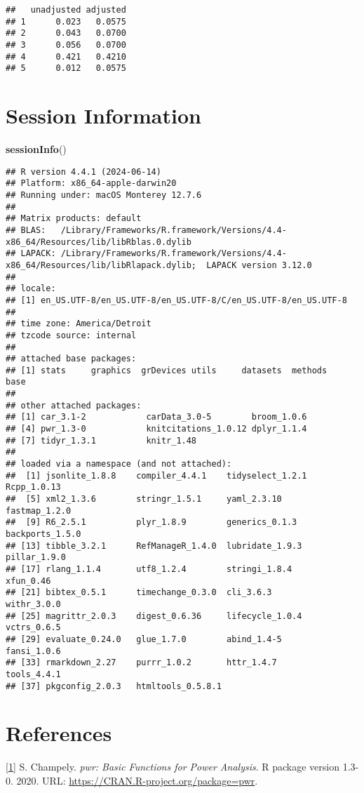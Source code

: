 \documentclass[
]{article}
\newenvironment{Shaded}{\begin{snugshade}}{\end{snugshade}}
\newcommand{\FunctionTok}[1]{\textcolor[rgb]{0.13,0.29,0.53}{\textbf{#1}}}
\newcommand{\NormalTok}[1]{#1}
\begin{document}
\begin{verbatim}
##   unadjusted adjusted
## 1      0.023   0.0575
## 2      0.043   0.0700
## 3      0.056   0.0700
## 4      0.421   0.4210
## 5      0.012   0.0575
\end{verbatim}

\section{Session Information}\label{session-information}

\begin{Shaded}
\begin{Highlighting}[]
\FunctionTok{sessionInfo}\NormalTok{()}
\end{Highlighting}
\end{Shaded}

\begin{verbatim}
## R version 4.4.1 (2024-06-14)
## Platform: x86_64-apple-darwin20
## Running under: macOS Monterey 12.7.6
## 
## Matrix products: default
## BLAS:   /Library/Frameworks/R.framework/Versions/4.4-x86_64/Resources/lib/libRblas.0.dylib 
## LAPACK: /Library/Frameworks/R.framework/Versions/4.4-x86_64/Resources/lib/libRlapack.dylib;  LAPACK version 3.12.0
## 
## locale:
## [1] en_US.UTF-8/en_US.UTF-8/en_US.UTF-8/C/en_US.UTF-8/en_US.UTF-8
## 
## time zone: America/Detroit
## tzcode source: internal
## 
## attached base packages:
## [1] stats     graphics  grDevices utils     datasets  methods   base     
## 
## other attached packages:
## [1] car_3.1-2            carData_3.0-5        broom_1.0.6         
## [4] pwr_1.3-0            knitcitations_1.0.12 dplyr_1.1.4         
## [7] tidyr_1.3.1          knitr_1.48          
## 
## loaded via a namespace (and not attached):
##  [1] jsonlite_1.8.8    compiler_4.4.1    tidyselect_1.2.1  Rcpp_1.0.13      
##  [5] xml2_1.3.6        stringr_1.5.1     yaml_2.3.10       fastmap_1.2.0    
##  [9] R6_2.5.1          plyr_1.8.9        generics_0.1.3    backports_1.5.0  
## [13] tibble_3.2.1      RefManageR_1.4.0  lubridate_1.9.3   pillar_1.9.0     
## [17] rlang_1.1.4       utf8_1.2.4        stringi_1.8.4     xfun_0.46        
## [21] bibtex_0.5.1      timechange_0.3.0  cli_3.6.3         withr_3.0.0      
## [25] magrittr_2.0.3    digest_0.6.36     lifecycle_1.0.4   vctrs_0.6.5      
## [29] evaluate_0.24.0   glue_1.7.0        abind_1.4-5       fansi_1.0.6      
## [33] rmarkdown_2.27    purrr_1.0.2       httr_1.4.7        tools_4.4.1      
## [37] pkgconfig_2.0.3   htmltools_0.5.8.1
\end{verbatim}

\section{References}\label{references}

\hyperref[cite-pwr]{{[}1{]}} S. Champely. \emph{pwr: Basic Functions for
Power Analysis}. R package version 1.3-0. 2020. URL:
\url{https://CRAN.R-project.org/package=pwr}.
\end{document}
